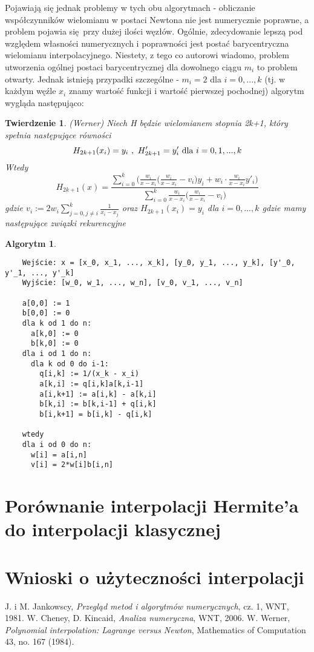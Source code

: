 \documentclass[10pt,wide]{mwart}
\newtheorem{tw}{Twierdzenie}
\theoremstyle{definition}
\newtheorem{alg}{Algorytm}
\begin{document}
Pojawiają się jednak problemy w tych obu algorytmach - obliczanie współczynników wielomianu w postaci Newtona nie jest numerycznie poprawne, a problem pojawia się przy dużej ilości węzłów.
Ogólnie, zdecydowanie lepszą pod względem własności numerycznych i poprawności jest postać barycentryczna wielomianu interpolacyjnego.
Niestety, z tego co autorowi wiadomo, problem utworzenia ogólnej postaci barycentrycznej dla dowolnego ciągu \(m_i\) to problem otwarty.
Jednak istnieją przypadki szczególne - \(m_i = 2\) dla \(i = 0,...,k\) (tj. w każdym węźle \(x_i\) znamy wartość funkcji i wartość pierwszej pochodnej)
algorytm wygląda następująco:
\begin{tw} (Werner)
Niech H będzie wielomianem stopnia 2k+1, który spełnia następujące równości
\begin{equation}
  H_{2k+1}(x_i) = y_i \text{ }\\, \text{ } H'_{2k+1} = y'_i \text{   dla   } i = 0, 1, ..., k
\end{equation}
Wtedy
\begin{equation}
  H_{2k+1}(x) = \frac{\sum_{i = 0}^{k}\Bigg(\frac{w_i}{x-x_i}\Big(\frac{w_i}{x-x_i} - v_i\Big)y_i + w_i\cdot\frac{w_i}{x-x_i}y'_i\Bigg) }{\sum_{i=0}^{k}\frac{w_i}{x-x_i}\Big(\frac{w_i}{x-x_i} - v_i\Big)}
\end{equation}
gdzie \(v_i := 2w_i \sum_{j = 0, j \neq i}^{k}\frac{1}{x_i - x_j}\)
oraz \(H_{2k+1}(x_i) = y_i\) dla \(i=0,...,k\)
gdzie mamy następujące związki rekurencyjne
\end{tw}
\begin{alg}
  \begin{verbatim}
    Wejście: x = [x_0, x_1, ..., x_k], [y_0, y_1, ..., y_k], [y'_0, y'_1, ..., y'_k]
    Wyjście: [w_0, w_1, ..., w_n], [v_0, v_1, ..., v_n]

    a[0,0] := 1
    b[0,0] := 0
    dla k od 1 do n:
      a[k,0] := 0
      b[k,0] := 0
    dla i od 1 do n:
      dla k od 0 do i-1:
        q[i,k] := 1/(x_k - x_i)
        a[k,i] := q[i,k]a[k,i-1]
        a[i,k+1] := a[i,k] - a[k,i]
        b[k,i] := b[k,i-1] + q[i,k]
        b[i,k+1] = b[i,k] - q[i,k]

    wtedy
    dla i od 0 do n:
      w[i] = a[i,n]
      v[i] = 2*w[i]b[i,n]
  \end{verbatim}
\end{alg}

\section{Porównanie interpolacji Hermite'a do interpolacji klasycznej}

\section{Wnioski o użyteczności interpolacji }


\begin{thebibliography}{9}
\itemsep10pt
 J. i M. Jankowscy, \emph{Przegląd metod i algorytmów numerycznych}, cz. 1, WNT, 1981.
 W. Cheney, D. Kincaid, \emph{Analiza numeryczna}, WNT, 2006.
 W. Werner, \emph{Polynomial interpolation: Lagrange versus Newton}, Mathematics of Computation 43, no. 167 (1984).
\end{thebibliography}
\end{document}
